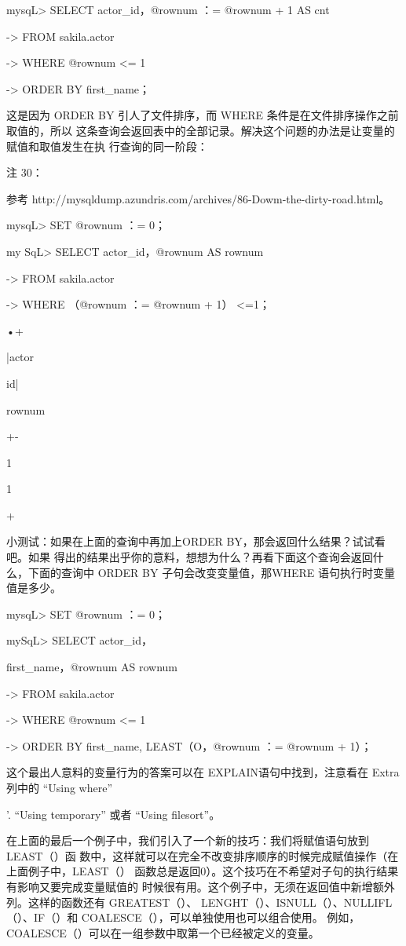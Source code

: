 mysqL> SELECT actor\_id，@rownum ：= @rownum + 1 AS cnt

-> FROM sakila.actor

-> WHERE @rownum <= 1

-> ORDER BY first\_name；

这是因为 ORDER BY 引人了文件排序，而 WHERE 条件是在文件排序操作之前取值的，所以
这条查询会返回表中的全部记录。解决这个问题的办法是让变量的赋值和取值发生在执
行查询的同一阶段：

注 30：

参考 http://mysqldump.azundris.com/archives/86-Dowm-the-dirty-road.html。

mysqL> SET @rownum ：= 0；

my SqL> SELECT actor\_id，@rownum AS rownum

-> FROM sakila.actor

-> WHERE （@rownum ：= @rownum + 1） <=1；

•+

|actor

id|

rownum

+-

1

1

+

小测试：如果在上面的查询中再加上ORDER BY，那会返回什么结果？试试看吧。如果
得出的结果出乎你的意料，想想为什么？再看下面这个查询会返回什么，下面的查询中
ORDER BY 子句会改变变量值，那WHERE 语句执行时变量值是多少。

mysqL> SET @rownum ：= 0；

mySqL> SELECT actor\_id，

first\_name，@rownum AS rownum

-> FROM sakila.actor

-> WHERE @rownum <= 1

-> ORDER BY first\_name, LEAST（O，@rownum ：= @rownum + 1）；

这个最出人意料的变量行为的答案可以在 EXPLAIN语句中找到，注意看在 Extra 列中的
“Using where”

’. “Using temporary” 或者 “Using filesort”。

在上面的最后一个例子中，我们引入了一个新的技巧：我们将赋值语句放到LEAST（）函
数中，这样就可以在完全不改变排序顺序的时候完成赋值操作（在上面例子中，LEAST（）
函数总是返回0）。这个技巧在不希望对子句的执行结果有影响又要完成变量赋值的
时候很有用。这个例子中，无须在返回值中新增额外列。这样的函数还有 GREATEST（）、
LENGHT（）、ISNULL（）、NULLIFL（）、IF（）和 COALESCE（），可以单独使用也可以组合使用。
例如，COALESCE（）可以在一组参数中取第一个已经被定义的变量。

